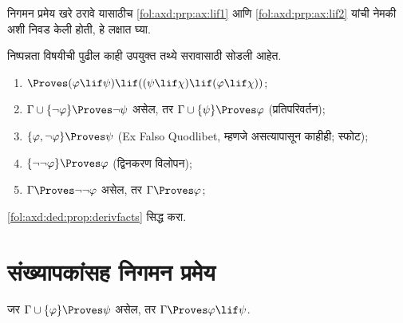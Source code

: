 निगमन प्रमेय खरे ठरावे यासाठीच \ref{fol:axd:prp:ax:lif1} आणि
\ref{fol:axd:prp:ax:lif2} यांची नेमकी अशी निवड केली होती, हे लक्षात घ्या.

निष्पन्नता विषयीची पुढील काही उपयुक्त तथ्ये सरावासाठी सोडली आहेत.

\begin{prop}
  \label{fol:axd:ded:prop:derivfacts}
\begin{enumerate}
\item $\Proves (\varphi \lif \psi) \lif ((\psi \lif \chi)
  \lif (\varphi \lif \chi))$; \label{fol:axd:ded:derivfacts:a}

\item $\Gamma \cup \{ \lnot \varphi\}
  \Proves \lnot \psi$ असेल, तर $\Gamma \cup \{ \psi\} \Proves
  \varphi$ (प्रतिपरिवर्तन); \label{fol:axd:ded:derivfacts:b}
\item  $\{ \varphi, \lnot\varphi\} \Proves
    \psi$ (Ex Falso Quodlibet, म्हणजे असत्यापासून काहीही; स्फोट); \label{fol:axd:ded:derivfacts:c}
\item  $\{ \lnot\lnot\varphi\} \Proves
  \varphi$ (द्विनकरण विलोपन);\label{fol:axd:ded:derivfacts:d}
\item $\Gamma \Proves \lnot\lnot\varphi$ असेल, तर $\Gamma \Proves
  \varphi$;\label{fol:axd:ded:derivfacts:e}
\end{enumerate}
\end{prop}


\begin{prob}
  \ref{fol:axd:ded:prop:derivfacts} सिद्ध करा.
\end{prob}















\section{संख्यापकांसह निगमन प्रमेय}\label{fol:axd:ddq:sec}

\begin{thm}[निगमन प्रमेय]
\label{fol:axd:ddq:thm:deduction-thm-q} जर $\Gamma \cup \{\varphi\} \Proves \psi$ असेल,
तर $\Gamma \Proves \varphi \lif \psi$.
\end{thm}

